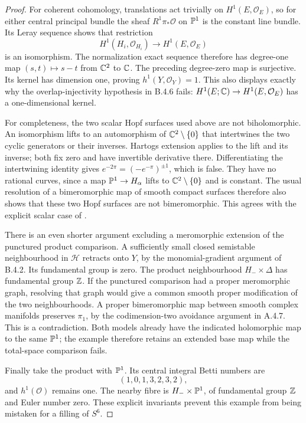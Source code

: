 \begin{proof}
For coherent cohomology, translations act trivially on
$H^1(E,\mathcal O_E)$, so for either central principal bundle
the sheaf $R^1\pi_*\mathcal O$ on $\mathbb P^1$ is the constant
line bundle.  Its Leray sequence shows that restriction
\[
 H^1(H_i,\mathcal O_{H_i})\longrightarrow H^1(E,\mathcal O_E)
\]
is an isomorphism.  The normalization exact sequence therefore
has degree-one map $(s,t)\mapsto s-t$ from $\mathbb C^2$ to $\mathbb C$.
The preceding degree-zero map is surjective.  Its kernel has
dimension one, proving $h^1(Y,\mathcal O_Y)=1$.
This also displays exactly why the overlap-injectivity hypothesis
in B.4.6 fails: $H^1(E;\mathbb C)\to H^1(E,\mathcal O_E)$ has a
one-dimensional kernel.

For completeness, the two scalar Hopf surfaces used above are
not biholomorphic.  An isomorphism lifts to an automorphism of
$\mathbb C^2\setminus\{0\}$ that intertwines the two cyclic generators
or their inverses.  Hartogs extension applies to the lift and
its inverse; both fix zero and have invertible derivative there.
Differentiating the intertwining identity gives
$e^{-2\pi}=(-e^{-\pi})^{\pm1}$, which is false.  They have
no rational curves, since a map $\mathbb P^1\to H_\alpha$ lifts to
$\mathbb C^2\setminus\{0\}$ and is constant.  The usual resolution
of a bimeromorphic map of smooth compact surfaces therefore
also shows that these two Hopf surfaces are not bimeromorphic.
This agrees with the explicit scalar case of
\citet[Section 2.2]{AbashevaDeev2024AB}.

There is an even shorter argument excluding a meromorphic
extension of the punctured product comparison.  A sufficiently
small closed semistable neighbourhood in $\mathcal H$ retracts
onto $Y$, by the monomial-gradient argument of B.4.2.  Its
fundamental group is zero.  The product neighbourhood
$H_-\times\Delta$ has fundamental group $\mathbb Z$.  If the
punctured comparison had a proper meromorphic graph, resolving
that graph would give a common smooth proper modification of
the two neighbourhoods.  A proper bimeromorphic map between
smooth complex manifolds preserves $\pi_1$, by the
codimension-two avoidance argument in A.4.7.  This is a
contradiction.  Both models already have the indicated
holomorphic map to the same $\mathbb P^1$; the example therefore
retains an extended base map while the total-space comparison
fails.

Finally take the product with $\mathbb P^1$.  Its central integral
Betti numbers are
\[
 (1,0,1,3,2,3,2),
\]
and $h^1(\mathcal O)$ remains one.  The nearby fibre is
$H_-\times\mathbb P^1$, of fundamental group $\mathbb Z$ and Euler
number zero.  These explicit invariants prevent this example
from being mistaken for a filling of $S^6$.
\end{proof}


